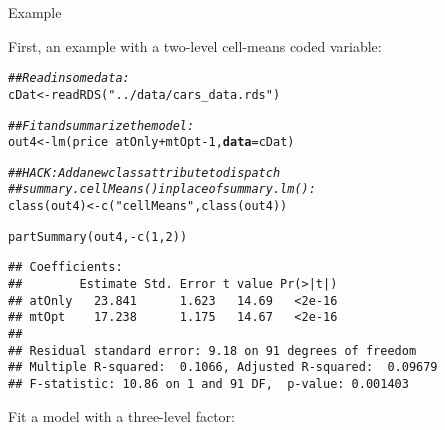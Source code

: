 \documentclass{beamer}\usepackage[]{graphicx}\usepackage[]{color}
\makeatletter
\newcommand{\hlnum}[1]{\textcolor[rgb]{0.69,0.494,0}{#1}}%
\newcommand{\hlstr}[1]{\textcolor[rgb]{0.749,0.012,0.012}{#1}}%
\newcommand{\hlcom}[1]{\textcolor[rgb]{0.514,0.506,0.514}{\textit{#1}}}%
\newcommand{\hlopt}[1]{\textcolor[rgb]{0,0,0}{#1}}%
\newcommand{\hlstd}[1]{\textcolor[rgb]{0,0,0}{#1}}%
\newcommand{\hlkwb}[1]{\textcolor[rgb]{0,0.341,0.682}{#1}}%
\newcommand{\hlkwc}[1]{\textcolor[rgb]{0,0,0}{\textbf{#1}}}%
\newcommand{\hlkwd}[1]{\textcolor[rgb]{0.004,0.004,0.506}{#1}}%
\newenvironment{kframe}{%
 \def\at@end@of@kframe{}%
 \ifinner\ifhmode%
  \def\at@end@of@kframe{\end{minipage}}%
  \begin{minipage}{\columnwidth}%
 \fi\fi%
 \def\FrameCommand##1{\hskip\@totalleftmargin \hskip-\fboxsep
 \colorbox{shadecolor}{##1}\hskip-\fboxsep
     \hskip-\linewidth \hskip-\@totalleftmargin \hskip\columnwidth}%
 \MakeFramed {\advance\hsize-\width
   \@totalleftmargin\z@ \linewidth\hsize
   \@setminipage}}%
 {\par\unskip\endMakeFramed%
 \at@end@of@kframe}
\newenvironment{knitrout}{}{} %
\makeatother
\begin{document}
\begin{frame}{Example}
  
  First, an example with a two-level cell-means coded variable:

\begin{knitrout}\footnotesize
{}\color{fgcolor}\begin{kframe}
\begin{alltt}
\hlcom{## Read in some data:}
\hlstd{cDat} \hlkwb{<-} \hlkwd{readRDS}\hlstd{(}\hlstr{"../data/cars_data.rds"}\hlstd{)}

\hlcom{## Fit and summarize the model:}
\hlstd{out4} \hlkwb{<-} \hlkwd{lm}\hlstd{(price} \hlopt{~} \hlstd{atOnly} \hlopt{+} \hlstd{mtOpt} \hlopt{-} \hlnum{1}\hlstd{,} \hlkwc{data} \hlstd{= cDat)}

\hlcom{## HACK: Add a new class attribute to dispatch }
\hlcom{##       summary.cellMeans() in place of summary.lm():}
\hlkwd{class}\hlstd{(out4)} \hlkwb{<-} \hlkwd{c}\hlstd{(}\hlstr{"cellMeans"}\hlstd{,} \hlkwd{class}\hlstd{(out4))}
\end{alltt}
\end{kframe}
\end{knitrout}

\pagebreak

\begin{knitrout}\footnotesize
{}\color{fgcolor}\begin{kframe}
\begin{alltt}
\hlkwd{partSummary}\hlstd{(out4,} \hlopt{-}\hlkwd{c}\hlstd{(}\hlnum{1}\hlstd{,} \hlnum{2}\hlstd{))}
\end{alltt}
\begin{verbatim}
## Coefficients:
##        Estimate Std. Error t value Pr(>|t|)
## atOnly   23.841      1.623   14.69   <2e-16
## mtOpt    17.238      1.175   14.67   <2e-16
## 
## Residual standard error: 9.18 on 91 degrees of freedom
## Multiple R-squared:  0.1066,	Adjusted R-squared:  0.09679 
## F-statistic: 10.86 on 1 and 91 DF,  p-value: 0.001403
\end{verbatim}
\end{kframe}
\end{knitrout}

\pagebreak
  
Fit a model with a three-level factor:


\end{frame}
\end{document}
